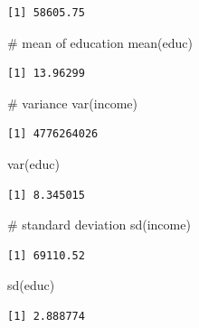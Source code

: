 \documentclass[
  letterpaper,
  DIV=11,
  numbers=noendperiod]{scrreprt}
\newenvironment{Shaded}{\begin{snugshade}}{\end{snugshade}}
\newcommand{\CommentTok}[1]{\textcolor[rgb]{0.37,0.37,0.37}{#1}}
\newcommand{\FunctionTok}[1]{\textcolor[rgb]{0.28,0.35,0.67}{#1}}
\newcommand{\NormalTok}[1]{\textcolor[rgb]{0.00,0.23,0.31}{#1}}
\begin{document}
\begin{verbatim}
[1] 58605.75
\end{verbatim}

\begin{Shaded}
\begin{Highlighting}[]
\CommentTok{\# mean of education}
\FunctionTok{mean}\NormalTok{(educ)}
\end{Highlighting}
\end{Shaded}

\begin{verbatim}
[1] 13.96299
\end{verbatim}

\begin{Shaded}
\begin{Highlighting}[]
\CommentTok{\# variance}
\FunctionTok{var}\NormalTok{(income)}
\end{Highlighting}
\end{Shaded}

\begin{verbatim}
[1] 4776264026
\end{verbatim}

\begin{Shaded}
\begin{Highlighting}[]
\FunctionTok{var}\NormalTok{(educ)}
\end{Highlighting}
\end{Shaded}

\begin{verbatim}
[1] 8.345015
\end{verbatim}

\begin{Shaded}
\begin{Highlighting}[]
\CommentTok{\# standard deviation}
\FunctionTok{sd}\NormalTok{(income)}
\end{Highlighting}
\end{Shaded}

\begin{verbatim}
[1] 69110.52
\end{verbatim}

\begin{Shaded}
\begin{Highlighting}[]
\FunctionTok{sd}\NormalTok{(educ)}
\end{Highlighting}
\end{Shaded}

\begin{verbatim}
[1] 2.888774
\end{verbatim}
\end{document}
